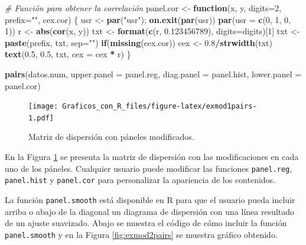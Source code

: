 \documentclass[10pt,]{krantz}
\makeatletter
\newenvironment{Shaded}{\begin{snugshade}}{\end{snugshade}}
\newcommand{\KeywordTok}[1]{\textcolor[rgb]{0.13,0.29,0.53}{\textbf{#1}}}
\newcommand{\DataTypeTok}[1]{\textcolor[rgb]{0.13,0.29,0.53}{#1}}
\newcommand{\DecValTok}[1]{\textcolor[rgb]{0.00,0.00,0.81}{#1}}
\newcommand{\FloatTok}[1]{\textcolor[rgb]{0.00,0.00,0.81}{#1}}
\newcommand{\StringTok}[1]{\textcolor[rgb]{0.31,0.60,0.02}{#1}}
\newcommand{\CommentTok}[1]{\textcolor[rgb]{0.56,0.35,0.01}{\textit{#1}}}
\newcommand{\ControlFlowTok}[1]{\textcolor[rgb]{0.13,0.29,0.53}{\textbf{#1}}}
\newcommand{\OperatorTok}[1]{\textcolor[rgb]{0.81,0.36,0.00}{\textbf{#1}}}
\newcommand{\NormalTok}[1]{#1}
\let\proglang=\textsf
\newenvironment{kframe}{%
\medskip{}
\setlength{\fboxsep}{.8em}
 \def\at@end@of@kframe{}%
 \ifinner\ifhmode%
  \def\at@end@of@kframe{\end{minipage}}%
  \begin{minipage}{\columnwidth}%
 \fi\fi%
 \def\FrameCommand##1{\hskip\@totalleftmargin \hskip-\fboxsep
 \colorbox{shadecolor}{##1}\hskip-\fboxsep
     \hskip-\linewidth \hskip-\@totalleftmargin \hskip\columnwidth}%
 \MakeFramed {\advance\hsize-\width
   \@totalleftmargin\z@ \linewidth\hsize
   \@setminipage}}%
 {\par\unskip\endMakeFramed%
 \at@end@of@kframe}
\renewenvironment{Shaded}{\begin{kframe}}{\end{kframe}}
\makeatother
\begin{document}
\begin{Shaded}
\begin{Highlighting}[]
\CommentTok{# Función para obtener la correlación}
\NormalTok{panel.cor <-}\StringTok{ }\ControlFlowTok{function}\NormalTok{(x, y, }\DataTypeTok{digits=}\DecValTok{2}\NormalTok{, }\DataTypeTok{prefix=}\StringTok{""}\NormalTok{, cex.cor)}
\NormalTok{\{}
\NormalTok{  usr <-}\StringTok{ }\KeywordTok{par}\NormalTok{(}\StringTok{"usr"}\NormalTok{); }\KeywordTok{on.exit}\NormalTok{(}\KeywordTok{par}\NormalTok{(usr))}
  \KeywordTok{par}\NormalTok{(}\DataTypeTok{usr =} \KeywordTok{c}\NormalTok{(}\DecValTok{0}\NormalTok{, }\DecValTok{1}\NormalTok{, }\DecValTok{0}\NormalTok{, }\DecValTok{1}\NormalTok{))}
\NormalTok{  r <-}\StringTok{ }\KeywordTok{abs}\NormalTok{(}\KeywordTok{cor}\NormalTok{(x, y))}
\NormalTok{  txt <-}\StringTok{ }\KeywordTok{format}\NormalTok{(}\KeywordTok{c}\NormalTok{(r, }\FloatTok{0.123456789}\NormalTok{), }\DataTypeTok{digits=}\NormalTok{digits)[}\DecValTok{1}\NormalTok{]}
\NormalTok{  txt <-}\StringTok{ }\KeywordTok{paste}\NormalTok{(prefix, txt, }\DataTypeTok{sep=}\StringTok{""}\NormalTok{)}
  \ControlFlowTok{if}\NormalTok{(}\KeywordTok{missing}\NormalTok{(cex.cor)) cex <-}\StringTok{ }\FloatTok{0.8}\OperatorTok{/}\KeywordTok{strwidth}\NormalTok{(txt)}
  \KeywordTok{text}\NormalTok{(}\FloatTok{0.5}\NormalTok{, }\FloatTok{0.5}\NormalTok{, txt, }\DataTypeTok{cex =}\NormalTok{ cex }\OperatorTok{*}\StringTok{ }\NormalTok{r)}
\NormalTok{\}}

\KeywordTok{pairs}\NormalTok{(datos.num,}
      \DataTypeTok{upper.panel =}\NormalTok{ panel.reg,}
      \DataTypeTok{diag.panel =}\NormalTok{ panel.hist,}
      \DataTypeTok{lower.panel =}\NormalTok{ panel.cor)}
\end{Highlighting}
\end{Shaded}

\begin{figure}
\centering
\texttt{[image: Graficos\_con\_R\_files/figure-latex/exmod1pairs-1.pdf]}
\caption{\label{fig:exmod1pairs}Matriz de dispersión con páneles
modificados.}
\end{figure}

En la Figura \ref{fig:exmod1pairs} se presenta la matriz de dispersión
con las modificaciones en cada uno de los páneles. Cualquier usuario
puede modificar las funciones \texttt{panel.reg}, \texttt{panel.hist} y
\texttt{panel.cor} para personalizar la apariencia de los contenidos.

La función \texttt{panel.smooth} está disponible en \proglang{R} para
que el usuario pueda incluir arriba o abajo de la diagonal un diagrama
de dispersión con una línea resultado de un ajuste suavizado. Abajo se
muestra el código de cómo incluir la función \texttt{panel.smooth} y en
la Figura \ref{fig:exmod2pairs} se muestra gráfico obtenido.
\end{document}
